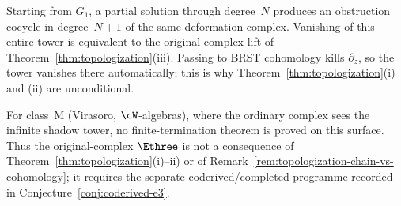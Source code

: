 \begin{remark}
Starting from $G_1$, a partial solution through degree~$N$
produces an obstruction cocycle in degree~$N{+}1$ of the same
deformation complex. Vanishing of this entire tower is
equivalent to the original-complex lift of
Theorem~\ref{thm:topologization}\textup{(iii)}.
Passing to BRST cohomology kills $\partial_z$, so the tower
vanishes there automatically; this is why
Theorem~\ref{thm:topologization}\textup{(i)} and
\textup{(ii)} are unconditional.
\end{remark}

\begin{remark}
\label{rem:class-M-topologization-boundary}
For class~M \textup{(}Virasoro, $\cW$-algebras\textup{)},
where the ordinary complex sees the infinite shadow tower, no
finite-termination theorem is proved on this surface. Thus the
original-complex $\Ethree$ is not a consequence of
Theorem~\ref{thm:topologization}\textup{(i)--ii)} or of
Remark~\ref{rem:topologization-chain-vs-cohomology};
it requires the separate coderived/completed programme recorded in
Conjecture~\ref{conj:coderived-e3}.
\end{remark}

